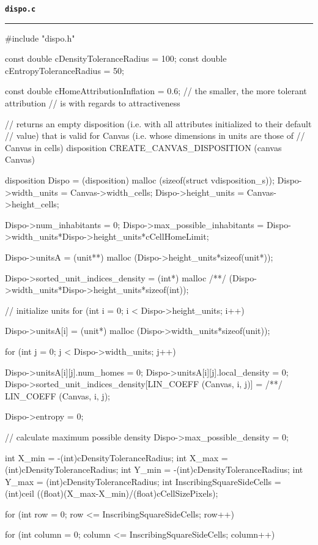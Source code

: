 \vspace*{5mm}
{\Large \texttt{\textbf{dispo.c}}}
\vspace*{1mm}
\hrule
\begin{C}
#include "dispo.h"


const double cDensityToleranceRadius = 100;
const double cEntropyToleranceRadius = 50;

const double cHomeAttributionInflation = 0.6; // the smaller, the more tolerant attribution
// is with regards to attractiveness


// returns an empty disposition (i.e. with all attributes initialized to their default
// value) that is valid for Canvas (i.e. whose dimensions in units are those of
// Canvas in cells)
disposition CREATE_CANVAS_DISPOSITION (canvas Canvas){
	
	disposition Dispo = (disposition) malloc (sizeof(struct vdisposition_s));
	Dispo->width_units = Canvas->width_cells;
	Dispo->height_units = Canvas->height_cells;
	
	Dispo->num_inhabitants = 0;
	Dispo->max_possible_inhabitants = Dispo->width_units*Dispo->height_units*cCellHomeLimit;
	
	Dispo->unitsA = (unit**) malloc (Dispo->height_units*sizeof(unit*));
	
	Dispo->sorted_unit_indices_density = (int*) malloc
	/**/ (Dispo->width_units*Dispo->height_units*sizeof(int));
	
	// initialize units
	for (int i = 0; i < Dispo->height_units; i++){
		
		Dispo->unitsA[i] = (unit*) malloc (Dispo->width_units*sizeof(unit));
		
		for (int j = 0; j < Dispo->width_units; j++){
			
			Dispo->unitsA[i][j].num_homes = 0;
			Dispo->unitsA[i][j].local_density = 0;
			Dispo->sorted_unit_indices_density[LIN_COEFF (Canvas, i, j)] =
			/**/ LIN_COEFF (Canvas, i, j);
		}
		
	}
	Dispo->entropy = 0;
	
	// calculate maximum possible density
	Dispo->max_possible_density = 0;
	
	int X_min = -(int)cDensityToleranceRadius; int X_max = (int)cDensityToleranceRadius;
	int Y_min = -(int)cDensityToleranceRadius; int Y_max = (int)cDensityToleranceRadius;
	int InscribingSquareSideCells = (int)ceil ((float)(X_max-X_min)/(float)cCellSizePixels);
	
	for (int row = 0; row <= InscribingSquareSideCells; row++){
		for (int column = 0; column <= InscribingSquareSideCells; column++){
			
}}}
\end{C}
